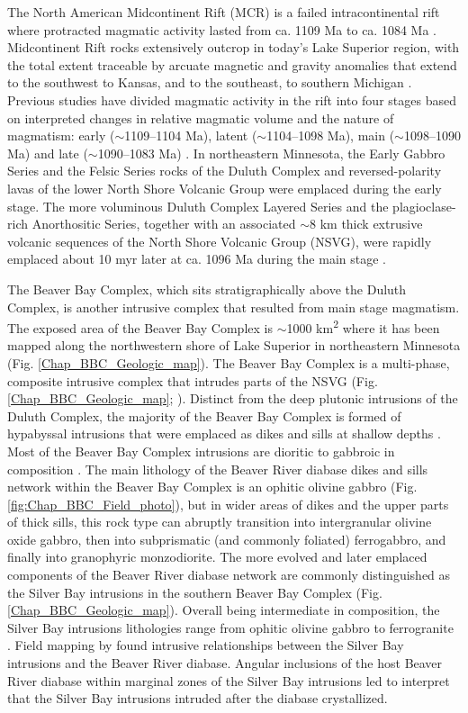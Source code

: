 The North American Midcontinent Rift (MCR) is a failed intracontinental rift where protracted magmatic activity lasted from ca. 1109 Ma to ca. 1084 Ma \citep{Swanson-Hysell2019a}. Midcontinent Rift rocks extensively outcrop in today's Lake Superior region, with the total extent traceable by arcuate magnetic and gravity anomalies that extend to the southwest to Kansas, and to the southeast, to southern Michigan \citep{Hinze2020a}. Previous studies have divided magmatic activity in the rift into four stages based on interpreted changes in relative magmatic volume and the nature of magmatism: early ($\sim$1109--1104 Ma), latent ($\sim$1104--1098 Ma), main ($\sim$1098--1090 Ma) and late ($\sim$1090--1083 Ma) \citep{Vervoort2007a, Heaman2007a, Miller2013a}. In northeastern Minnesota, the Early Gabbro Series and the Felsic Series rocks of the Duluth Complex and reversed-polarity lavas of the lower North Shore Volcanic Group were emplaced during the early stage. The more voluminous Duluth Complex Layered Series and the plagioclase-rich Anorthositic Series, together with an associated $\sim$8 km thick extrusive volcanic sequences of the North Shore Volcanic Group (NSVG), were rapidly emplaced about 10 myr later at ca. 1096 Ma during the main stage \citep{Paces1993a, Swanson-Hysell2021a}. 

The Beaver Bay Complex, which sits stratigraphically above the Duluth Complex, is another intrusive complex that resulted from main stage magmatism. The exposed area of the Beaver Bay Complex is $\sim$1000 km\textsuperscript{2} where it has been mapped along the northwestern shore of Lake Superior in northeastern Minnesota (Fig. \ref{Chap_BBC_Geologic_map}). The Beaver Bay Complex is a multi-phase, composite intrusive complex that intrudes parts of the NSVG (Fig. \ref{Chap_BBC_Geologic_map}; \citealp{Miller1997a, Swanson-Hysell2021a}). Distinct from the deep plutonic intrusions of the Duluth Complex, the majority of the Beaver Bay Complex is formed of hypabyssal intrusions that were emplaced as dikes and sills at shallow depths \citep{Miller1997a}. Most of the Beaver Bay Complex intrusions are dioritic to gabbroic in composition \citep{Miller1997a}. The main lithology of the Beaver River diabase dikes and sills network within the Beaver Bay Complex is an ophitic olivine gabbro (Fig. \ref{fig:Chap_BBC_Field_photo}), but in wider areas of dikes and the upper parts of thick sills, this rock type can abruptly transition into intergranular olivine oxide gabbro, then into subprismatic (and commonly foliated) ferrogabbro, and finally into granophyric monzodiorite. The more evolved and later emplaced components of the Beaver River diabase network are commonly distinguished as the Silver Bay intrusions in the southern Beaver Bay Complex (Fig. \ref{Chap_BBC_Geologic_map}). Overall being intermediate in composition, the Silver Bay intrusions lithologies range from ophitic olivine gabbro to ferrogranite \citep{Shank1989a}. Field mapping by \cite{Miller1994a} found intrusive relationships between the Silver Bay intrusions and the Beaver River diabase. Angular inclusions of the host Beaver River diabase within marginal zones of the Silver Bay intrusions led \cite{Miller1997a} to interpret that the Silver Bay intrusions intruded after the diabase crystallized.


